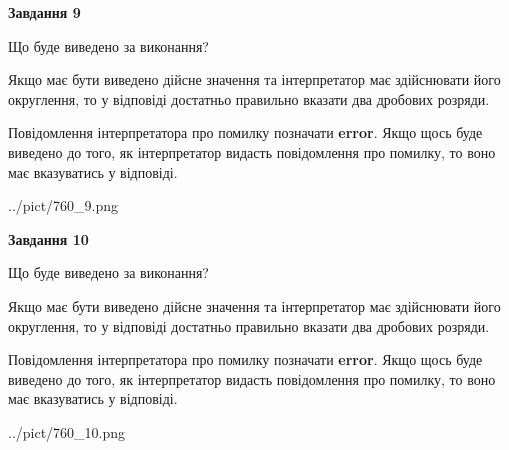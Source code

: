 \documentclass[12pt, ukrainian]{article}
\begin{document}
{\begin {Large}
{\begin {center}\textbf{Завдання 9}\end {center}}\par
Що буде виведено за виконання? \par

Якщо має бути виведено дійсне значення та інтерпретатор має здійснювати його округлення, 
то у відповіді достатньо правильно вказати два дробових розряди.

Повідомлення інтерпретатора про помилку позначати \textbf{error}.
Якщо щось буде виведено до того, як інтерпретатор видасть повідомлення про помилку, 
то воно має вказуватись у відповіді. \par

\begin{center}
	{../pict/760_9.png}
\end{center}
\newpage

{\begin {center}\textbf{Завдання 10}\end {center}}\par
Що буде виведено за виконання? \par

Якщо має бути виведено дійсне значення та інтерпретатор має здійснювати його округлення, 
то у відповіді достатньо правильно вказати два дробових розряди.

Повідомлення інтерпретатора про помилку позначати \textbf{error}.
Якщо щось буде виведено до того, як інтерпретатор видасть повідомлення про помилку, 
то воно має вказуватись у відповіді. \par

\begin{center}
	{../pict/760_10.png}
\end{center}
\newpage

\end {Large}}
\end{document}
